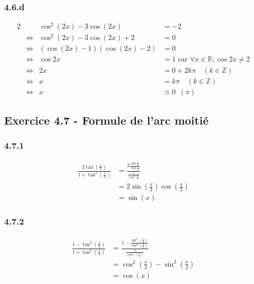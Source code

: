 \documentclass[a4paper,10pt]{report}
\begin{document}
\subsubsection*{4.6.d}
\begin{alignat*}{2}
	&                    &        \cos^2(2x) -3\cos(2x) &= -2 \\
	&\Longleftrightarrow &    \cos^2(2x) -3\cos(2x) + 2 &= 0  \\
	&\Longleftrightarrow & (\cos(2x) - 1)(\cos(2x) - 2) &= 0  \\
	&\Longleftrightarrow &                      \cos 2x &= 1  \text{ car } \forall x \in \mathbb{R}, \cos 2x \neq 2\\
	&\Longleftrightarrow &                           2x &= 0 + 2k\pi \quad (k \in \mathbb{Z}) \\
	&\Longleftrightarrow &                           x  &= k\pi \quad (k \in \mathbb{Z}) \\	
	&\Longleftrightarrow &                            x &\equiv 0 \enspace \left( \pi \right)
\end{alignat*}


\subsection*{Exercice 4.7 - Formule de l'arc moitié}

\subsubsection*{4.7.1}
\begin{equation*}
	\begin{split}
		\frac{2 \tan(\frac{x}{2})}{1 + \tan^2(\frac{x}{2})} 
			&= \frac{2\frac{\sin\frac{x}{2}}{\cos \frac{x}{2}}}{\frac{1}{\cos^2 \frac{x}{2}}} \\
			&= 2 \sin(\frac{x}{2})\cos(\frac{x}{2}) \\
			&= \sin(x)
	\end{split}
\end{equation*}

\subsubsection*{4.7.2}
\begin{equation*}
	\begin{split}
		\frac{1 - \tan^2(\frac{x}{2})}{1 + \tan^2(\frac{x}{2})} 
		&= \frac{1 - \frac{\sin^2(\frac{x}{2})}{\cos^2(\frac{x}{2})}}{\frac{1}{\cos^2(\frac{x}{2})}} \\
		&= \cos^2(\frac{x}{2}) - \sin^2(\frac{x}{2}) \\
		&= \cos(x)
	\end{split}
\end{equation*}
\end{document}
